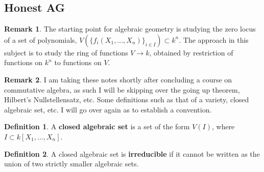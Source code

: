 \documentclass[11pt]{article}
\theoremstyle{definition}
\newtheorem{defn}{Definition}
\newtheorem*{rmk}{Remark}
\newcommand{\set}[1]{\{#1\}}
\begin{document}
    \subsection{Honest AG}
    \begin{rmk}
        The starting point for algebraic geometry is studying the zero locus of a set of polynomials, \(V(\set{f_i(X_1,\hdots,X_n)}_{i \in I}) \subset k^n\). The approach in this subject is to study the ring of functions \(V \to k\), obtained by restriction of functions on \(k^n\) to functions on \(V\).
    \end{rmk}
    \begin{rmk}
        I am taking these notes shortly after concluding a course on commutative algebra, as such I will be skipping over the going up theorem, Hilbert's Nullstellensatz, etc. Some definitions such as that of a variety, closed algebraic set, etc. I will go over again as to establish a convention.
    \end{rmk}
    \begin{defn}
        A \textbf{closed algebraic set} is a set of the form \(V(I)\), where \(I \subset k[X_1,\hdots,X_n]\).
    \end{defn}
    \begin{defn}
        A closed algebraic set is \textbf{irreducible} if it cannot be written as the union of two strictly smaller algebraic sets.
    \end{defn}
\end{document}
